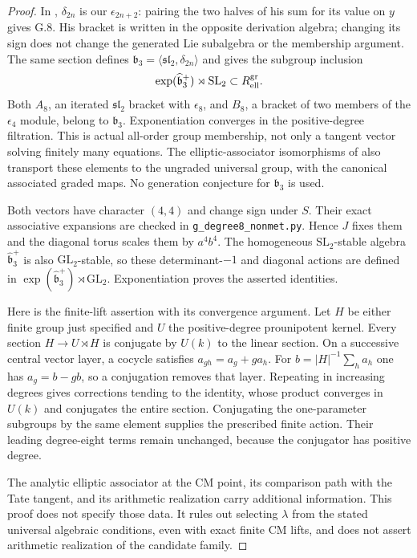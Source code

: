 \begin{proof}
In \citet[Proposition 4.19, equation (48)]{Enriquez2014},
$\delta_{2n}$ is our $\epsilon_{2n+2}$: pairing the two halves
of his sum for its value on $y$ gives G.8. His bracket is
written in the opposite derivation algebra; changing its sign
does not change the generated Lie subalgebra or the membership
argument. The same section defines
$\mathfrak b_3=\langle\mathfrak{sl}_2,\delta_{2n}\rangle$ and
gives the subgroup inclusion
\[
 \exp(\widehat{\mathfrak b}_3^+)\rtimes\mathrm{SL}_2
                      \subset R_{\rm ell}^{\rm gr}.
\]
Both $A_8$, an iterated $\mathfrak{sl}_2$ bracket with
$\epsilon_8$, and $B_8$, a bracket of two members of the
$\epsilon_4$ module, belong to $\mathfrak b_3$.
Exponentiation converges in the positive-degree filtration.
This is actual all-order group membership, not only a tangent
vector solving finitely many equations. The elliptic-associator
isomorphisms of \citet[\S4.8 and Proposition 4.20]{Enriquez2014}
also transport these elements to the ungraded universal group,
with the canonical associated graded maps. No generation
conjecture for $\mathfrak b_3$ is used.

Both vectors have character $(4,4)$ and change sign under $S$.
Their exact associative expansions are checked in
\texttt{g\_degree8\_nonmet.py}. Hence $J$ fixes them and the
diagonal torus scales them by $a^4b^4$. The homogeneous
$\mathrm{SL}_2$-stable algebra $\widehat{\mathfrak b}_3^+$
is also $\mathrm{GL}_2$-stable, so these determinant-$-1$
and diagonal actions are defined in
$\exp(\widehat{\mathfrak b}_3^+)\rtimes\mathrm{GL}_2$.
Exponentiation proves the asserted identities.

Here is the finite-lift assertion with its convergence argument.
Let $H$ be either finite group just specified and $U$ the
positive-degree prounipotent kernel. Every section
$H\to U\rtimes H$ is conjugate by $U(k)$ to the linear section.
On a successive central vector layer, a cocycle satisfies
$a_{gh}=a_g+g a_h$. For $b=|H|^{-1}\sum_h a_h$ one has
$a_g=b-gb$, so a conjugation removes that layer.
Repeating in increasing degrees gives corrections tending to
the identity, whose product converges in $U(k)$ and conjugates
the entire section. Conjugating the one-parameter subgroups by
the same element supplies the prescribed finite action.
Their leading degree-eight terms remain unchanged, because
the conjugator has positive degree.

The analytic elliptic associator at the CM point, its comparison
path with the Tate tangent, and its arithmetic realization carry
additional information. This proof does not specify those data.
It rules out selecting $\lambda$ from the stated universal
algebraic conditions, even with exact finite CM lifts, and
does not assert arithmetic realization of the candidate family.
\end{proof}

